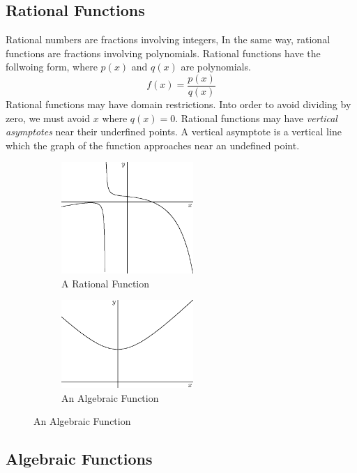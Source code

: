 \documentclass[fleqn]{report}
\begin{document}
\subsection{Rational Functions}
\label{rational-functions}

Rational numbers are fractions involving integers, In the same
way, rational functions are fractions involving polynomials.
Rational functions have the follwoing form, where $p(x)$ and
$q(x)$ are polynomials.
\begin{equation*}
f(x) = \frac{p(x)}{q(x)} 
\end{equation*}
Rational functions may have domain
restrictions. Into order to avoid dividing by zero, we must
avoid $x$ where $q(x) = 0$. Rational functions may have
\emph{vertical asymptotes} near their underfined points. A
vertical asymptote is a vertical line which the graph of the 
function approaches near an undefined point. 

\begin{figure}[b]
\centering
\begin{subfigure}{.5\textwidth}
 \centering
 \includegraphics[width=5cm]{figure29.eps}
 \caption{A Rational Function}
\end{subfigure}%
\begin{subfigure}{.5\textwidth}
 \centering
 \includegraphics[width=5cm]{figure30.eps}
 \caption{An Algebraic Function}
\end{subfigure}
\label{figure-types-of-functions3}
\end{figure}

\subsection{Algebraic Functions} 
\label{algebraic-functions}
\end{document}

